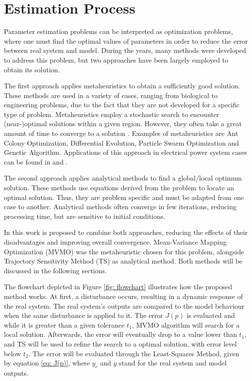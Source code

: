\chapter{Estimation Process}

\label{ch: Estim}

Parameter estimation problems can be interpreted as optimization problems, where one must find the optimal values of parameters in order to reduce the error between real system and model. During the years, many methods were developed to address this problem, but two approaches have been largely employed to obtain its solution. 

The first approach applies metaheuristics to obtain a sufficiently good solution. These methods are used in a variety of cases, ranging from biological to engineering problems, due to the fact that they are not developed for a specific type of problem. Metaheuristics employ a stochastic search to encounter (near-)optimal solutions within a given region. However, they often take a great amount of time to converge to a solution \cite{Blum2003}. Examples of metaheuristics are Ant Colony Optimization, Differential Evolution, Particle Swarm Optimization and Genetic Algorithm. Applications of this approach in electrical power system cases can be found in \cite{Todorovski2006} and \cite{Yoshida2000}.

The second approach applies analytical methods to find a global/local optimum solution. These methods use equations derived from the problem to locate an optimal solution. Thus, they are problem specific and must be adapted from one case to another. Analytical methods often converge in few iterations, reducing processing time, but are sensitive to initial conditions.

In this work is proposed to combine both approaches, reducing the effects of their disadvantages and improving overall convergence. Mean-Variance Mapping Optimization (MVMO) was the metaheuristic chosen for this problem, alongside Trajectory Sensitivity Method (TS) as analytical method. Both methods will be discussed in the following sections.

The flowchart depicted in Figure \ref{fig: flowchart} illustrates how the proposed method works. At first, a disturbance occurs, resulting in a dynamic response of the real system. The real system's outputs are compared to the model behaviour when the same disturbance is applied to it. The error $J(p)$ is evaluated and while it is greater than a given tolerance $t_{1}$, MVMO algorithm will search for a local solution. Afterwards, the error will eventually drop to a value lower than $t_{1}$, and TS will be used to refine the search to a optimal solution, with error level below $t_{2}$. The error will be evaluated through the Least-Squares Method, given by equation \ref{eq: J(p)}, where $y_{r}$ and $y$ stand for the real system and model outputs.

